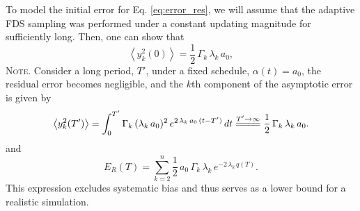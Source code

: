 \documentclass[reprint, superscriptaddress, floatfix]{revtex4-1}
\newcommand{\note}[1]{{\color{DarkGreen}\footnotesize \textsc{Note.} #1}}
\newcommand{\Err}{E}
\begin{document}



%











To model the initial error for Eq. \eqref{eq:error_res},
we will assume that
the adaptive FDS sampling
was performed under a constant updating magnitude
for sufficiently long.
%
Then, one can show that
\begin{equation}
  \left\langle y_k^2(0) \right\rangle = \frac 1 2 \, \Gamma_k \, \lambda_k \, a_0
  ,
  \label{eq:y2_eql}
\end{equation}
%
\note{
Consider a long period, $T'$, under a fixed schedule,
$\alpha(t) = a_0$,
the residual error becomes negligible, and
the $k$th component of the asymptotic error
is given by
%
\begin{align*}
  \left\langle y_k^2(T') \right\rangle
  =
  \int_0^{T'}
    \Gamma_k \, (\lambda_k \, a_0)^2 \,
      e^{ 2 \, \lambda_k \, a_0 \, (t - T') }
    \, dt
  \stackrel{ T' \to \infty }
  { =\joinrel=\joinrel=\joinrel= }
  \frac 1 2 \, \Gamma_k \, \lambda_k \, a_0
  .
\notag
\end{align*}
}
%
and
%
\begin{equation}
  \Err_R(T)
  =
  \sum_{k = 2}^n
      \frac 1 2 \, a_0 \, \Gamma_k \, \lambda_k \,
      e^{  - 2 \, \lambda_k \, q(T) }
  .
  \label{eq:error_res1}
\end{equation}
%
This expression excludes systematic bias
and thus serves as a lower bound for a realistic simulation.
\end{document}

